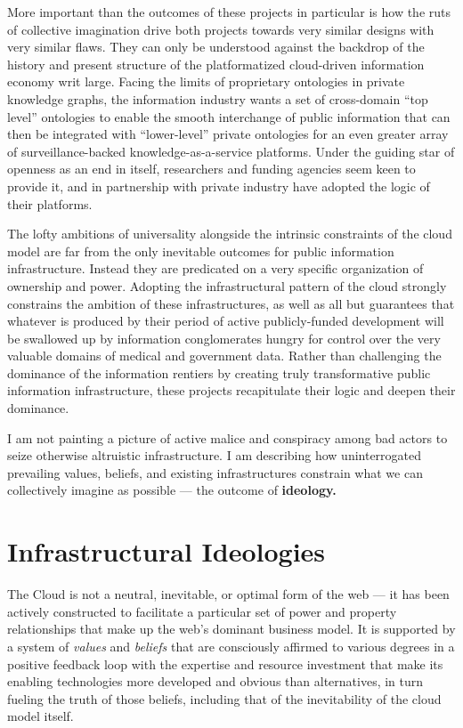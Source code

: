 More important than the outcomes of these projects in particular is how
the ruts of collective imagination drive both projects towards very
similar designs with very similar flaws. They can only be understood
against the backdrop of the history and present structure of the
platformatized cloud-driven information economy writ large. Facing the
limits of proprietary ontologies in private knowledge graphs, the
information industry wants a set of cross-domain ``top level''
ontologies to enable the smooth interchange of public information that
can then be integrated with ``lower-level'' private ontologies for an
even greater array of surveillance-backed knowledge-as-a-service
platforms. Under the guiding star of openness as an end in itself,
researchers and funding agencies seem keen to provide it, and in
partnership with private industry have adopted the logic of their
platforms.

The lofty ambitions of universality alongside the intrinsic constraints
of the cloud model are far from the only inevitable outcomes for public
information infrastructure. Instead they are predicated on a very
specific organization of ownership and power. Adopting the
infrastructural pattern of the cloud strongly constrains the ambition of
these infrastructures, as well as all but guarantees that whatever is
produced by their period of active publicly-funded development will be
swallowed up by information conglomerates hungry for control over the
very valuable domains of medical and government data. Rather than
challenging the dominance of the information rentiers by creating truly
transformative public information infrastructure, these projects
recapitulate their logic and deepen their dominance.

I am not painting a picture of active malice and conspiracy among bad
actors to seize otherwise altruistic infrastructure. I am describing how
uninterrogated prevailing values, beliefs, and existing infrastructures
constrain what we can collectively imagine as possible --- the outcome
of \textbf{ideology.}

\hypertarget{infrastructural-ideologies}{%
\section{Infrastructural Ideologies}\label{infrastructural-ideologies}}

The Cloud is not a neutral, inevitable, or optimal form of the web ---
it has been actively constructed to facilitate a particular set of power
and property relationships that make up the web's dominant business
model. It is supported by a system of \emph{values} and \emph{beliefs}
that are consciously affirmed to various degrees in a positive feedback
loop with the expertise and resource investment that make its enabling
technologies more developed and obvious than alternatives, in turn
fueling the truth of those beliefs, including that of the inevitability
of the cloud model itself.

